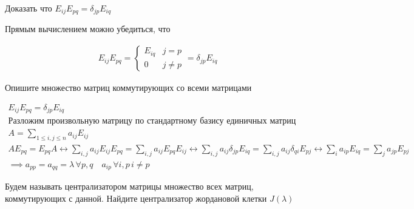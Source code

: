 \begin{prb}
Доказать что $E_{ij}E_{pq} =  \delta_{jp} E_{iq}$
\end{prb}

\begin{sol}
Прямым вычислением можно убедиться, что 

   \begin{align*}
        E_{ij}E_{pq}=\left\{
        \begin{array}{ll}
        E_{iq} & j = p\\
        0 & j\neq p
        \end{array}\right.
        = \delta_{jp}E_{iq}
    \end{align*} 
   
\end{sol}

\begin{prb}
Опишите множество матриц коммутирующих со всеми матрицами
\end{prb}

\begin{sol}
\begin{gather*}
    E_{ij}E_{pq} =  \delta_{jp} E_{iq}\\
    \mbox{Разложим произвольную матрицу по стандартному базису единичных матриц}\\
    A = \sum_{1 \leq i,j \leq n} a_{ij} E_{ij}\\
    A E_{pq} = E_{pq} A  \leftrightarrow \sum_{i,j} a_{ij} E_{ij}E_{pq} = \sum_{i,j} a_{ij} E_{pq} E_{ij} 
    \leftrightarrow  \sum_{i,j} a_{ij} \delta_{jp} E_{iq} = \sum_{i,j} a_{ij} \delta_{qi} E_{pj} \leftrightarrow \sum_{i} a_{ip} E_{iq} = \sum_{j} a_{jp} E_{pj} \\
    \implies
    a_{pp} = a_{qq}  = \lambda \, \forall p,q \quad
    a_{ip} \, \forall i,p \, i\neq p
\end{gather*}
\end{sol}


\begin{prb}
Будем называть централизатором матрицы множество всех матриц, коммутирующих с данной. Найдите централизатор жордановой клетки $J(\lambda)$
\end{prb}

